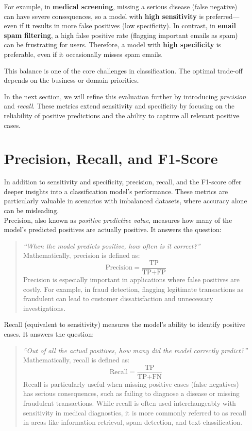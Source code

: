 \documentclass[
  11pt,
]{book}
\theoremstyle{definition}
\theoremstyle{definition}
\theoremstyle{definition}
\theoremstyle{definition}
\theoremstyle{remark}
\begin{document}
For example, in \textbf{medical screening}, missing a serious disease (false negative) can have severe consequences, so a model with \textbf{high sensitivity} is preferred---even if it results in more false positives (low specificity). In contrast, in \textbf{email spam filtering}, a high false positive rate (flagging important emails as spam) can be frustrating for users. Therefore, a model with \textbf{high specificity} is preferable, even if it occasionally misses spam emails.

This balance is one of the core challenges in classification. The optimal trade-off depends on the business or domain priorities.

In the next section, we will refine this evaluation further by introducing \emph{precision} and \emph{recall}. These metrics extend sensitivity and specificity by focusing on the reliability of positive predictions and the ability to capture all relevant positive cases.

\section{Precision, Recall, and F1-Score}\label{precision-recall-and-f1-score}

In addition to sensitivity and specificity, precision, recall, and the F1-score offer deeper insights into a classification model's performance. These metrics are particularly valuable in scenarios with imbalanced datasets, where accuracy alone can be misleading.\\
Precision, also known as \emph{positive predictive value}, measures how many of the model's predicted positives are actually positive. It answers the question:

\begin{quote}
\emph{``When the model predicts positive, how often is it correct?''}\\
Mathematically, precision is defined as:\\
\[
\text{Precision} = \frac{\text{TP}}{\text{TP} + \text{FP}}
\]
Precision is especially important in applications where false positives are costly. For example, in fraud detection, flagging legitimate transactions as fraudulent can lead to customer dissatisfaction and unnecessary investigations.
\end{quote}

Recall (equivalent to sensitivity) measures the model's ability to identify positive cases. It answers the question:

\begin{quote}
\emph{``Out of all the actual positives, how many did the model correctly predict?''}\\
Mathematically, recall is defined as:\\
\[
\text{Recall} = \frac{\text{TP}}{\text{TP} + \text{FN}}
\]
Recall is particularly useful when missing positive cases (false negatives) has serious consequences, such as failing to diagnose a disease or missing fraudulent transactions. While recall is often used interchangeably with sensitivity in medical diagnostics, it is more commonly referred to as recall in areas like information retrieval, spam detection, and text classification.
\end{quote}
\end{document}
